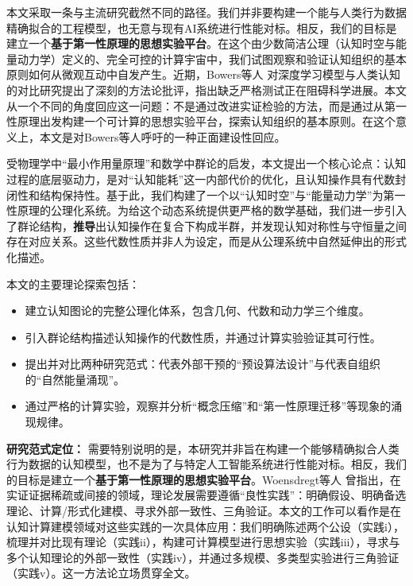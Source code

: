 \documentclass[12pt,a4paper]{article}
\begin{document}
本文采取一条与主流研究截然不同的路径。我们并非要构建一个能与人类行为数据精确拟合的工程模型，也无意与现有AI系统进行性能对标。相反，我们的目标是建立一个\textbf{基于第一性原理的思想实验平台}。在这个由少数简洁公理（认知时空与能量动力学）定义的、完全可控的计算宇宙中，我们试图观察和验证认知组织的基本原则如何从微观互动中自发产生。近期，Bowers等人 \cite{bowers2023importance} 对深度学习模型与人类认知的对比研究提出了深刻的方法论批评，指出缺乏严格测试正在阻碍科学进展。本文从一个不同的角度回应这一问题：不是通过改进实证检验的方法，而是通过从第一性原理出发构建一个可计算的思想实验平台，探索认知组织的基本原则。在这个意义上，本文是对Bowers等人呼吁的一种正面建设性回应。

受物理学中“最小作用量原理”和数学中群论的启发，本文提出一个核心论点：认知过程的底层驱动力，是对“认知能耗”这一内部代价的优化，且认知操作具有代数封闭性和结构保持性。基于此，我们构建了一个以“认知时空”与“能量动力学”为第一性原理的公理化系统。为给这个动态系统提供更严格的数学基础，我们进一步引入了群论结构，\textbf{推导}出认知操作在复合下构成半群，并发现认知对称性与守恒量之间存在对应关系。这些代数性质并非人为设定，而是从公理系统中自然延伸出的形式化描述。

本文的主要理论探索包括：
\begin{itemize}
    \item 建立认知图论的完整公理化体系，包含几何、代数和动力学三个维度。
    \item 引入群论结构描述认知操作的代数性质，并通过计算实验验证其可行性。
    \item 提出并对比两种研究范式：代表外部干预的“预设算法设计”与代表自组织的“自然能量涌现”。
    \item 通过严格的计算实验，观察并分析“概念压缩”和“第一性原理迁移”等现象的涌现规律。
\end{itemize}

\textbf{研究范式定位：} 需要特别说明的是，本研究并非旨在构建一个能够精确拟合人类行为数据的认知模型，也不是为了与特定人工智能系统进行性能对标。相反，我们的目标是建立一个\textbf{基于第一性原理的思想实验平台}。Woensdregt等人 \cite{woensdregt2024lessons} 曾指出，在实证证据稀疏或间接的领域，理论发展需要遵循“良性实践”：明确假设、明确备选理论、计算/形式化建模、寻求外部一致性、三角验证。本文的工作可以看作是在认知计算建模领域对这些实践的一次具体应用：我们明确陈述两个公设（实践i），梳理并对比现有理论（实践ii），构建可计算模型进行思想实验（实践iii），寻求与多个认知理论的外部一致性（实践iv），并通过多规模、多类型实验进行三角验证（实践v）。这一方法论立场贯穿全文。

\end{document}
